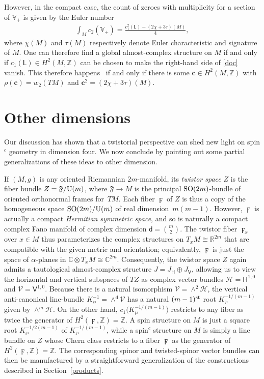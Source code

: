 \documentclass[pdftex]{sigma}
\numberwithin{equation}{section}
\def\CC{\mathbb{C}}
\def\ZZ{\mathbb{Z}}
\def\RR{\mathbb{R}}
\begin{document}
However, in the compact case, the count of zeroes with multiplicity for a section of $\mathbb{V}_+$ is given by
the Euler number
\begin{gather}\label{doc}
 \int_M c_2 (\mathbb{V}_+) = \frac{c_1^2 (\mathsf{L}) - (2\chi + 3\tau )(M)}{4},
\end{gather}
where $\chi (M)$ and $\tau (M)$ respectively denote Euler characteristic and signature of $M$.
One can therefore find a global almost-complex structure on $M$ if and only if $c_1(\mathsf{L})\in H^2(M, \ZZ)$
can be chosen to make the right-hand side of \eqref{doc} vanish. This therefore happens~\cite{hiho} if and only if
there is some $\mathbf{c}\in H^2(M, \ZZ)$ with $\rho (\mathbf{c} ) = w_2(TM)$ and $\mathbf{c}^2 = (2\chi + 3\tau )(M)$.

\section{Other dimensions}

Our discussion has shown that a twistorial perspective can shed
new light on spin$^c$ geometry in dimension four.
We now conclude by pointing out some partial generalizations
of these ideas to other dimension.

If $(M,g)$ is any oriented Riemannian $2m$-manifold, its {\em twistor space} $Z$ is the fiber bundle
$Z = \mathfrak{F}/{\rm U}(m)$, where $\mathfrak{F}\to M$ is the principal ${\rm SO}(2m)$-bundle
of oriented orthonormal frames for~$TM$. Each fiber ${\digamma}$ of $Z$ is thus a copy of the homogeneous
 space ${\rm SO}(2m)/{\rm U}(m)$ of real dimension~$m(m-1)$. However, ${\digamma}$ is actually a compact
{\em Hermitian symmetric space}, and so is naturally a compact complex Fano manifold of complex
dimension $\mathsf{d}=\binom{m}{2}$. The twistor fiber $\digamma_x$ over $x\in M$ thus parameterizes the complex structures on $T_xM\cong \RR^{2m}$ that are
compatible with the given metric and orientation; equivalently, $\digamma$ is just the space
of $\alpha$-planes \cite[Appendix]{pr2} in $\CC\otimes T_xM\cong \CC^{2m}$.
Consequently, the twistor space $Z$ again admits a tautological almost-complex structure $J= J_\mathsf{H} \oplus J_\mathsf{V}$, allowing
us to view the horizontal and vertical subspaces of $TZ$ as complex vector bundles $\mathscr{H}= \mathsf{H}^{1,0}$
and $\mathscr{V}= \mathsf{V}^{1,0}$. Because there is a natural isomorphism $\mathscr{V} = \wedge^2 \mathscr{H}$,
the vertical anti-canonical line-bundle
$K^{-1}_\wp= \wedge^{\mathsf{d}}\mathscr{V}$ has a natural $(m-1)^{\rm st}$ root
$K^{-1/(m-1)}_\wp$ given by $\wedge^m\mathscr{H}$.
On the other hand, $c_1 \big(K^{-1/(m-1)}_\wp\big)$ restricts to any fiber as twice the generator of
$H^2 ({{\digamma}}, \ZZ) = \ZZ$.
 A spin structure on $M$ is just a
square root $K^{-1/2(m-1)}_\wp$ of
$K^{-1/(m-1)}_\wp$, while a spin$^c$ structure on $M$ is simply a line bundle on $Z$
whose Chern class restricts to a fiber ${{\digamma}}$ as the generator of $H^2({{\digamma}},\ZZ)=\ZZ$.
The corresponding spinor and twisted-spinor vector bundles can then be manufactured by a straightforward generalization of
the constructions described in Section~\ref{products}.
\end{document}
